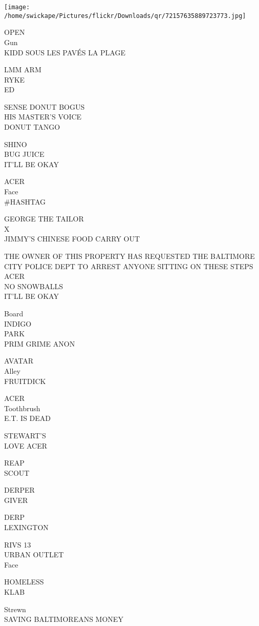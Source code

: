 \documentclass[10pt,letterpaper]{article}
\begin{document}
\texttt{[image: /home/swickape/Pictures/flickr/Downloads/qr/72157635889723773.jpg]}
\pagebreak

OPEN\\
Gun\\
KIDD SOUS LES PAVÉS LA PLAGE

LMM ARM\\
RYKE\\
ED

SENSE DONUT BOGUS\\
HIS MASTER'S VOICE\\
DONUT TANGO

SHINO\\
BUG JUICE\\
IT'LL BE OKAY

ACER\\
Face\\
\#HASHTAG

GEORGE THE TAILOR\\
X\\
JIMMY'S CHINESE FOOD CARRY OUT

THE OWNER OF THIS PROPERTY HAS REQUESTED THE BALTIMORE CITY POLICE DEPT TO ARREST ANYONE SITTING ON THESE STEPS\\
ACER\\
NO SNOWBALLS\\
IT'LL BE OKAY

Board\\
INDIGO\\
PARK\\
PRIM GRIME ANON

AVATAR\\
Alley\\
FRUITDICK

ACER\\
Toothbrush\\
E.T. IS DEAD

STEWART'S\\
LOVE ACER

REAP\\
SCOUT

DERPER\\
GIVER

DERP\\
LEXINGTON

RIVS 13\\
URBAN OUTLET\\
Face

HOMELESS\\
KLAB

Strewn\\
SAVING BALTIMOREANS MONEY
\end{document}
